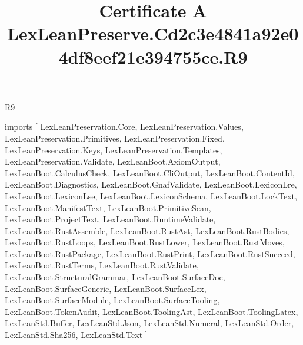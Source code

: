 \begin{lexlean}{R9}
\title{Certificate A LexLeanPreserve.Cd2c3e4841a92e04df8eef21e394755ce.R9}
\begin{coremodule}
imports [
  LexLeanPreservation.Core,
  LexLeanPreservation.Values,
  LexLeanPreservation.Primitives,
  LexLeanPreservation.Fixed,
  LexLeanPreservation.Keys,
  LexLeanPreservation.Templates,
  LexLeanPreservation.Validate,
  LexLeanBoot.AxiomOutput,
  LexLeanBoot.CalculusCheck,
  LexLeanBoot.CliOutput,
  LexLeanBoot.ContentId,
  LexLeanBoot.Diagnostics,
  LexLeanBoot.GnafValidate,
  LexLeanBoot.LexiconLre,
  LexLeanBoot.LexiconLse,
  LexLeanBoot.LexiconSchema,
  LexLeanBoot.LockText,
  LexLeanBoot.ManifestText,
  LexLeanBoot.PrimitiveScan,
  LexLeanBoot.ProjectText,
  LexLeanBoot.RuntimeValidate,
  LexLeanBoot.RustAssemble,
  LexLeanBoot.RustAst,
  LexLeanBoot.RustBodies,
  LexLeanBoot.RustLoops,
  LexLeanBoot.RustLower,
  LexLeanBoot.RustMoves,
  LexLeanBoot.RustPackage,
  LexLeanBoot.RustPrint,
  LexLeanBoot.RustSucceed,
  LexLeanBoot.RustTerms,
  LexLeanBoot.RustValidate,
  LexLeanBoot.StructuralGrammar,
  LexLeanBoot.SurfaceDoc,
  LexLeanBoot.SurfaceGeneric,
  LexLeanBoot.SurfaceLex,
  LexLeanBoot.SurfaceModule,
  LexLeanBoot.SurfaceTooling,
  LexLeanBoot.TokenAudit,
  LexLeanBoot.ToolingAst,
  LexLeanBoot.ToolingLatex,
  LexLeanStd.Buffer,
  LexLeanStd.Json,
  LexLeanStd.Numeral,
  LexLeanStd.Order,
  LexLeanStd.Sha256,
  LexLeanStd.Text
]


\end{coremodule}
\end{lexlean}
